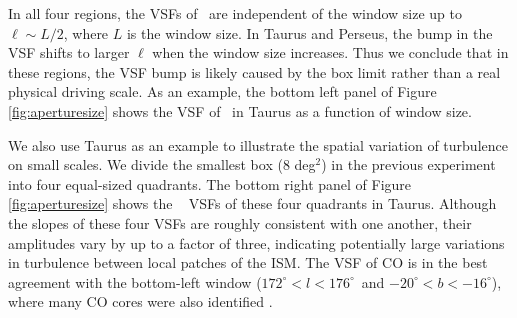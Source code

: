 In all four regions, the VSFs of \halpha~are independent of the window size up to $\ell \sim L/2$, where $L$ is the window size. In Taurus and Perseus, the bump in the VSF shifts to larger $\ell$ when the window size increases. Thus we conclude that in these regions, the VSF bump is likely caused by the box limit rather than a real physical driving scale. As an example, the bottom left panel of Figure \ref{fig:aperturesize} shows the VSF of \halpha~in Taurus as a function of window size. 



We also use Taurus as an example to illustrate the spatial variation of turbulence on small scales. We divide the smallest box (8 deg$^2$) in the previous experiment into four equal-sized quadrants. The bottom right panel of Figure \ref{fig:aperturesize} shows the \halpha~ VSFs of these four quadrants in Taurus. Although the slopes of these four VSFs are roughly consistent with one another, their amplitudes vary by up to a factor of three, indicating potentially large variations in turbulence between local patches of the ISM\@. The VSF of CO is in the best agreement with the bottom-left window ($172^{\circ} < l < 176^{\circ}$~and $-20^{\circ} < b < -16^{\circ}$), where many CO cores were also identified \citep[see Figure 2 of][for detailed locations of CO cores in Taurus]{qian_13co_2012}.
